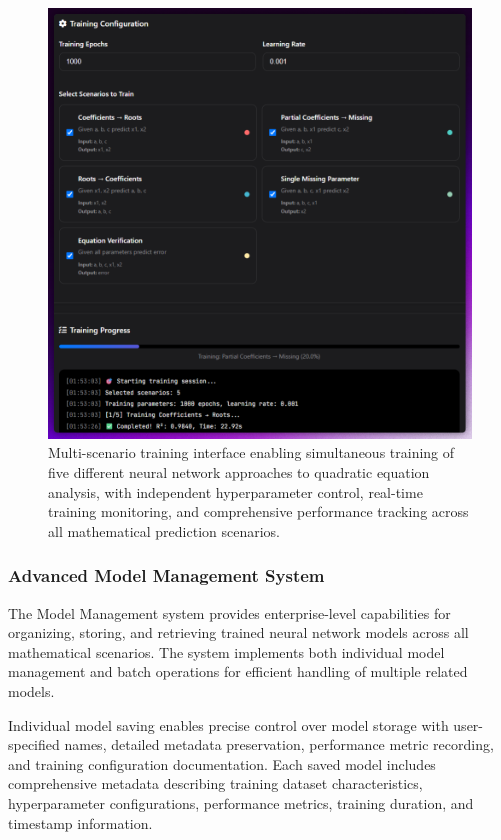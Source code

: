 \documentclass[11pt,a4paper]{report}
\begin{document}
\begin{figure}[H]
\centering
\includegraphics[width=\textwidth]{quadratic_predictor_training_tab.png}
\caption{Multi-scenario training interface enabling simultaneous training of five different neural network approaches to quadratic equation analysis, with independent hyperparameter control, real-time training monitoring, and comprehensive performance tracking across all mathematical prediction scenarios.}
\label{fig:quadratic_training}
\end{figure}

\subsubsection{Advanced Model Management System}

The Model Management system provides enterprise-level capabilities for organizing, storing, and retrieving trained neural network models across all mathematical scenarios. The system implements both individual model management and batch operations for efficient handling of multiple related models.

Individual model saving enables precise control over model storage with user-specified names, detailed metadata preservation, performance metric recording, and training configuration documentation. Each saved model includes comprehensive metadata describing training dataset characteristics, hyperparameter configurations, performance metrics, training duration, and timestamp information.
\end{document}

